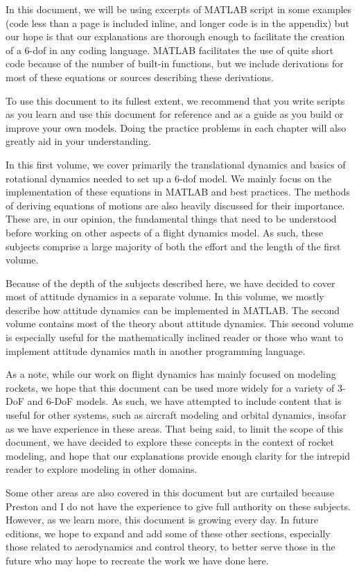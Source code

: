 \documentclass[12pt]{report}
\begin{document}
In this document, we will be using excerpts of MATLAB script in some examples (code less than a page is included inline, and longer code is in the appendix) but our hope is that our explanations are thorough enough to facilitate the creation of a 6-\gls{dof} in any coding language. MATLAB facilitates the use of quite short code because of the number of built-in functions, but we include derivations for most of these equations or sources describing these derivations.

To use this document to its fullest extent, we recommend that you write scripts as you learn and use this document for reference and as a guide as you build or improve your own models. Doing the practice problems in each chapter will also greatly aid in your understanding.

In this first volume, we cover primarily the translational dynamics and basics of rotational dynamics needed to set up a 6-\gls{dof} model. We mainly focus on the implementation of these equations in MATLAB and best practices. The methods of deriving equations of motions are also heavily discussed for their importance. These are, in our opinion, the fundamental things that need to be understood before working on other aspects of a flight dynamics model. As such, these subjects comprise a large majority of both the effort and the length of the first volume.

Because of the depth of the subjects described here, we have decided to cover most of attitude dynamics in a separate volume. In this volume, we mostly describe how attitude dynamics can be implemented in MATLAB. The second volume contains most of the theory about attitude dynamics. This second volume is especially useful for the mathematically inclined reader or those who want to implement attitude dynamics math in another programming language.

As a note, while our work on flight dynamics has mainly focused on modeling rockets, we hope that this document can be used more widely for a variety of 3-DoF and 6-DoF models. As such, we have attempted to include content that is useful for other systems, such as aircraft modeling and orbital dynamics, insofar as we have experience in these areas. That being said, to limit the scope of this document, we have decided to explore these concepts in the context of rocket modeling, and hope that our explanations provide enough clarity for the intrepid reader to explore modeling in other domains.

Some other areas are also covered in this document but are curtailed because Preston and I do not have the experience to give full authority on these subjects. However, as we learn more, this document is growing every day. In future editions, we hope to expand and add some of these other sections, especially those related to aerodynamics and control theory, to better serve those in the future who may hope to recreate the work we have done here.
\end{document}
